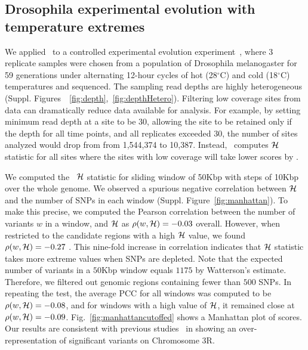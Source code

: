 \documentclass[11pt]{article}
\def\comale{\text{{\sc Comale}}}
\begin{document}
\subsection{Drosophila experimental evolution with temperature extremes}
We applied \comale\ to a controlled experimental evolution
experiment~\cite{orozco2012adaptation}, where $3$ replicate samples
were chosen from a population of Drosophila melanogaster for 59
generations under alternating 12-hour cycles of hot (28$^{\circ}$C)
and cold (18$^{\circ}$C) temperatures and sequenced. The sampling read
depths are highly heterogeneous
(Suppl. Figures~~\ref{fig:depth},~\ref{fig:depthHetero}). Filtering
low coverage sites from data can dramatically reduce data available
for analysis. For example, by setting minimum read depth at a site to
be $30$, allowing the site to be retained only if the depth for all
time points, and all replicates exceeded $30$, the number of sites
analyzed would drop from from 1,544,374 to 10,387. Instead, \comale\
computes ${\cal H}$ statistic for all sites where the sites with low coverage will 
take lower scores by \comale.

We computed the \comale\ ${\cal H}$ statistic for sliding
window of 50Kbp with steps of 10Kbp over the whole genome. We observed
a spurious negative correlation between ${\cal H}$ and the number of SNPs
in each window (Suppl. Figure~\ref{fig:manhattan}). To make this
precise, we computed the Pearson correlation between the number of
variants $w$ in a window, and ${\cal H}$ as $\rho(w,{\cal H})=-0.03$
overall. However, when restricted to the candidate regions with a high
${\cal H}$ value, we found $\rho(w,{\cal H})=-0.27$ . This nine-fold increase in
correlation indicates that ${\cal H}$ statistic takes more extreme values
when SNPs are depleted. Note that the expected number of variants in a
$50$Kbp window equals $1175$ by Watterson's estimate. Therefore, we
filtered out genomic regions containing fewer than $500$ SNPs. In
repeating the test, the average PCC for all windows was computed to be
$\rho(w,{\cal H})=-0.08$, and for windows with a high value of ${\cal H}$, it
remained close at
$\rho(w,{\cal H})=-0.09$. Fig.~\ref{fig:manhattancutoffed} shows a
Manhattan plot of scores. Our results are consistent with previous
studies~\cite{orozco2012adaptation} in showing an over-representation
of significant variants on Chromosome 3R.
\end{document}
